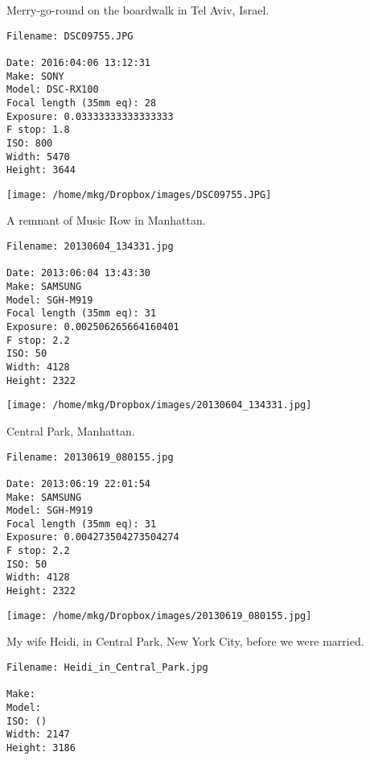 \noindent Merry-go-round on the boardwalk in Tel Aviv, Israel.
\begin{lstlisting}
Filename: DSC09755.JPG

Date: 2016:04:06 13:12:31
Make: SONY
Model: DSC-RX100
Focal length (35mm eq): 28
Exposure: 0.03333333333333333
F stop: 1.8
ISO: 800
Width: 5470
Height: 3644
\end{lstlisting}

\begin{landscape}

\texttt{[image: /home/mkg/Dropbox/images/DSC09755.JPG]}
\end{landscape}



\noindent A remnant of Music Row in Manhattan.
\begin{lstlisting}
Filename: 20130604_134331.jpg

Date: 2013:06:04 13:43:30
Make: SAMSUNG
Model: SGH-M919
Focal length (35mm eq): 31
Exposure: 0.002506265664160401
F stop: 2.2
ISO: 50
Width: 4128
Height: 2322
\end{lstlisting}

\begin{landscape}

\texttt{[image: /home/mkg/Dropbox/images/20130604\_134331.jpg]}
\end{landscape}



\noindent Central Park, Manhattan.
\begin{lstlisting}
Filename: 20130619_080155.jpg

Date: 2013:06:19 22:01:54
Make: SAMSUNG
Model: SGH-M919
Focal length (35mm eq): 31
Exposure: 0.004273504273504274
F stop: 2.2
ISO: 50
Width: 4128
Height: 2322
\end{lstlisting}

\begin{landscape}

\texttt{[image: /home/mkg/Dropbox/images/20130619\_080155.jpg]}
\end{landscape}



\noindent My wife Heidi, in Central Park, New York City, before we were married.
\begin{lstlisting}
Filename: Heidi_in_Central_Park.jpg

Make: 
Model: 
ISO: ()
Width: 2147
Height: 3186
\end{lstlisting}

